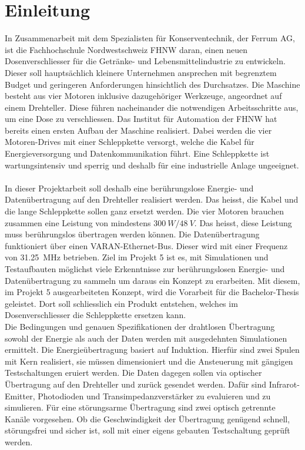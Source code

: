 \section{Einleitung}
In Zusammenarbeit mit dem Spezialisten für Konserventechnik, der Ferrum AG, ist die Fachhochschule Nordwestschweiz FHNW daran, einen neuen Dosenverschliesser für die Getränke- und Lebensmittelindustrie zu entwickeln. Dieser soll hauptsächlich kleinere Unternehmen ansprechen mit begrenztem Budget und geringeren Anforderungen hinsichtlich des Durchsatzes. Die Maschine besteht aus vier Motoren inklusive dazugehöriger Werkzeuge, angeordnet auf einem Drehteller. Diese führen nacheinander die notwendigen Arbeitsschritte aus, um eine Dose zu verschliessen. Das Institut für Automation der FHNW hat bereits einen ersten Aufbau der Maschine realisiert. Dabei werden die vier Motoren-Drives mit einer Schleppkette versorgt, welche die Kabel für Energieversorgung und Datenkommunikation führt. Eine Schleppkette ist wartungsintensiv und sperrig und deshalb für eine industrielle Anlage ungeeignet.
\newline
\ \\
In dieser Projektarbeit soll deshalb eine berührungslose Energie- und Datenübertragung auf den Drehteller realisiert werden. Das heisst, die Kabel und die lange Schleppkette sollen ganz ersetzt werden. Die vier Motoren brauchen zusammen eine Leistung von mindestens $\SI{300}{W}/\SI{48}{V}$. Das heisst, diese Leistung muss berührungslos übertragen werden können. Die Datenübertragung funktioniert über einen VARAN-Ethernet-Bus. Dieser wird mit einer Frequenz von \SI{31.25}{MHz} betrieben. Ziel im Projekt 5 ist es, mit Simulationen und Testaufbauten möglichst viele Erkenntnisse zur berührungslosen Energie- und Datenübertragung zu sammeln um daraus ein Konzept zu erarbeiten. Mit diesem, im Projekt 5 ausgearbeiteten Konzept, wird die Vorarbeit für die Bachelor-Thesis geleistet. Dort soll schliesslich ein Produkt entstehen, welches im Dosenverschliesser die Schleppkette ersetzen kann.
\newline
\ \\
Die Bedingungen und genauen Spezifikationen der drahtlosen Übertragung sowohl der Energie als auch der Daten werden mit ausgedehnten Simulationen ermittelt. Die Energieübertragung basiert auf Induktion. Hierfür sind zwei Spulen mit Kern realisiert, sie müssen dimensioniert und die Ansteuerung mit gängigen Testschaltungen eruiert werden. Die Daten dagegen sollen via optischer Übertragung auf den Drehteller und zurück gesendet werden. Dafür sind Infrarot-Emitter, Photodioden und Transimpedanzverstärker zu evaluieren und zu simulieren. Für eine störungsarme Übertragung sind zwei optisch getrennte Kanäle vorgesehen. Ob die Geschwindigkeit der Übertragung genügend schnell, störungsfrei und sicher ist, soll mit einer eigens gebauten Testschaltung geprüft werden.
